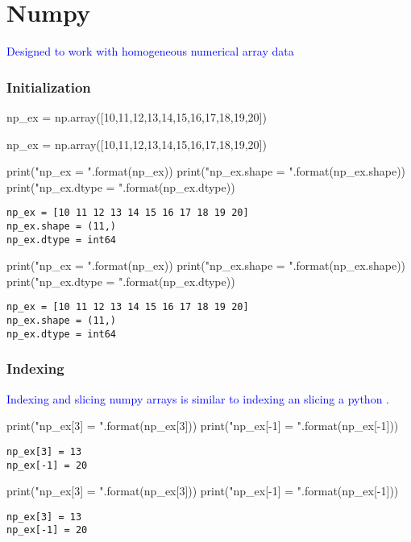 \section{Numpy}

\textcolor{blue}{Designed to work with homogeneous numerical array data}


\subsubsection{Initialization}

\begin{python}
np_ex = np.array([10,11,12,13,14,15,16,17,18,19,20])
\end{python}
\begin{python}
np_ex = np.array([10,11,12,13,14,15,16,17,18,19,20])
\end{python}


\begin{python}
print("np_ex = {}".format(np_ex))
print("np_ex.shape = {}".format(np_ex.shape))
print("np_ex.dtype = {}".format(np_ex.dtype))
\end{python}
\begin{lstlisting}[style=pyOutStyle]
np_ex = [10 11 12 13 14 15 16 17 18 19 20]
np_ex.shape = (11,)
np_ex.dtype = int64
\end{lstlisting}
\begin{python}
print("np_ex = {}".format(np_ex))
print("np_ex.shape = {}".format(np_ex.shape))
print("np_ex.dtype = {}".format(np_ex.dtype))
\end{python}
\begin{lstlisting}[style=pyOutStyle]
np_ex = [10 11 12 13 14 15 16 17 18 19 20]
np_ex.shape = (11,)
np_ex.dtype = int64
\end{lstlisting}


\subsubsection{Indexing}

\textcolor{blue}{Indexing and slicing numpy arrays is similar to indexing an slicing a python .}

\begin{python}
print("np_ex[3] = {}".format(np_ex[3]))
print("np_ex[-1] = {}".format(np_ex[-1]))
\end{python}
\begin{lstlisting}[style=pyOutStyle]
np_ex[3] = 13
np_ex[-1] = 20
\end{lstlisting}
\begin{python}
print("np_ex[3] = {}".format(np_ex[3]))
print("np_ex[-1] = {}".format(np_ex[-1]))
\end{python}
\begin{lstlisting}[style=pyOutStyle]
np_ex[3] = 13
np_ex[-1] = 20
\end{lstlisting}


